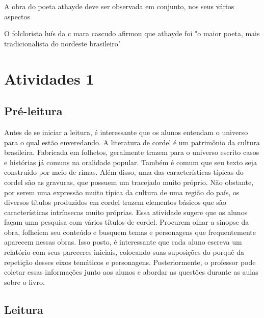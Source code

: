 \documentclass[12pt]{extarticle}
\begin{document}
A obra do poeta athayde deve ser observada em conjunto, nos seus vários aspectos

O folclorista luís da c mara cascudo afirmou que athayde foi "o maior poeta, mais tradicionalista do nordeste brasileiro"


\section{Atividades 1}


\subsection{Pré-leitura}


Antes de se iniciar a leitura, é interessante que os alunos
entendam o universo para o qual estão enveredando. A literatura de
cordel é um patrimônio da cultura brasileira. Fabricada em folhetos,
geralmente trazem para o universo escrito casos e histórias já comuns na
oralidade popular. Também é comum que seu texto seja construído por meio
de rimas. Além disso, uma das características típicas do cordel são as
gravuras, que possuem um tracejado muito próprio. Não obstante, por
serem uma expressão muito típica da cultura de uma região do país, os
diversos títulos produzidos em cordel trazem elementos básicos que são
características intrínsecas muito próprias. Essa atividade sugere que os
alunos façam uma pesquisa com vários títulos de cordel. Procurem olhar a
sinopse da obra, folheiem seu conteúdo e busquem temas e personagens que
frequentemente aparecem nessas obras. Isso posto, é interessante que
cada aluno escreva um relatório com seus pareceres iniciais, colocando
suas suposições do porquê da repetição desses eixos temáticos e
personagens. Posteriormente, o professor pode coletar essas informações
junto aos alunos e abordar as questões durante as aulas sobre o livro.


\subsection{Leitura}

\end{document}
